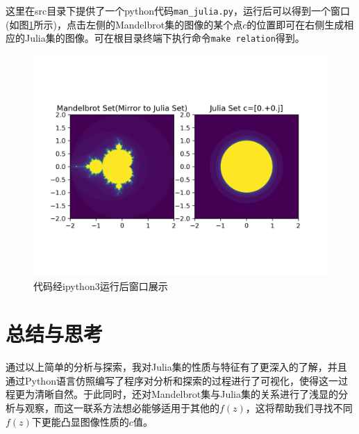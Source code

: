 \documentclass[a4paper]{ctexart}
\begin{document}
这里在src目录下提供了一个python代码\texttt{man\_julia.py}\cite{julia_zhihuRe}，运行后可以得到一个窗口(如图\ref{tu5}所示)，点击左侧的Mandelbrot集的图像的某个点$c$的位置即可在右侧生成相应的Julia集的图像。可在根目录终端下执行命令\texttt{make relation}得到。
\begin{figure}[H]
	\centering
	\includegraphics[width=.8\textwidth]{../png/300dpi/show.png}
	\caption{代码经ipython3运行后窗口展示}
	\label{tu5}
\end{figure}

\section{总结与思考}
通过以上简单的分析与探索，我对Julia集的性质与特征有了更深入的了解，并且通过Python语言仿照编写了程序对分析和探索的过程进行了可视化，使得这一过程更为清晰自然。于此同时，还对Mandelbrot集与Julia集的关系进行了浅显的分析与观察，而这一联系方法想必能够适用于其他的$f(z)$，这将帮助我们寻找不同$f(z)$下更能凸显图像性质的$c$值。

\centering

	
\end{document}
